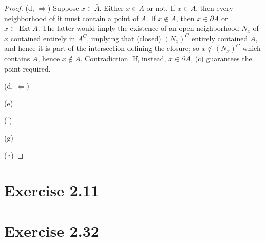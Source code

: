 \documentclass{article}
\theoremstyle{definition}
\begin{document}
\begin{proof}
(d, $\Rightarrow$)
Suppose $x \in \bar{A}$. Either $x \in A$ or not. If $x \in A$, then every
neighborhood of it must contain a point of $A$. If $x \not\in A$, then
$x \in \partial A$ or $x \in \operatorname{Ext} A$. The latter would imply
the existence of an open neighborhood $N_x$ of $x$ contained entirely in $A^C$,
implying that (closed) $(N_x)^C$ entirely contained $A$, and hence it is 
part of the intersection defining the closure; so $x \not\in (N_x)^C$ which
contains $\bar{A}$, hence $x \not\in \bar{A}$. Contradiction. If, instead,
$x \in \partial A$, (c) guarantees the point required.

(d, $\Leftarrow$)

(e)

(f)

(g)

(h)
\end{proof}

\section{Exercise 2.11}
\section{Exercise 2.32}
\end{document}
